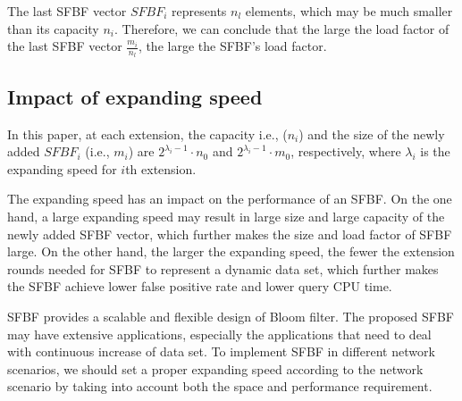 \documentclass[10pt,journal,compsoc]{IEEEtran}
\begin{document}
The last SFBF vector $SFBF_i$ represents $n_l$ elements,
  which may be much smaller than its capacity $n_i$.
Therefore, we can conclude that the large the load factor of the last SFBF vector $\frac{m_i}{n_{l}}$, the large the SFBF's load factor.

\subsection{Impact of expanding speed}
\label{sub:Impact of expanding speed}
In this paper, at each extension, the capacity i.e., ($n_i$) and the size of the newly added $SFBF_i$ (i.e., $m_i$) are ${{{2^{\lambda_i  - 1}} \cdot {n_0}}}$ and ${{{2^{\lambda_i  - 1}} \cdot {m_0}}}$, respectively, where $\lambda_i$ is the expanding speed for $i$th extension.

The expanding speed has an impact on the performance of an SFBF. On the one hand, a large expanding speed may result in large size and large capacity of the newly added SFBF vector, which further makes the size and load factor of SFBF large. On the other hand, the larger the expanding speed, the fewer the extension rounds needed for SFBF to represent a dynamic data set, which further makes the SFBF achieve lower false positive rate and lower query CPU time.


SFBF provides a scalable and  flexible design of Bloom filter. The proposed SFBF may have extensive applications, especially the applications that need to deal with continuous increase of data set. To implement SFBF in different network scenarios, we should set a proper expanding speed according to the network scenario by taking into account both the space and performance requirement.

%
\end{document}
